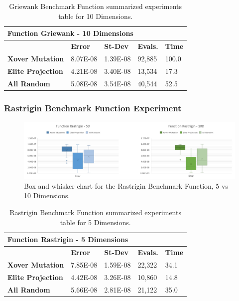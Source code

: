 \documentclass[graybox]{svmult}
\begin{document}
\begin{table}[]
    \scriptsize
    \centering
    \caption{Griewank Benchmark Function summarized experiments table for 10 Dimensions.}\label{tab.fun_griewank10}
    \begin{tabular}{@{}lllll@{}}
    \toprule
    \multicolumn{5}{l}{\textbf{Function Griewank - 10 Dimensions}} \\ \midrule
     & \textbf{Error} & \textbf{St-Dev} & \textbf{Evals.} & \textbf{Time} \\
    \textbf{Xover Mutation} & 8.07E-08 & 1.39E-08 & 92,885 & 100.0 \\
    \textbf{Elite Projection} & 4.21E-08 & 3.40E-08 & 13,534 & 17.3 \\
    \textbf{All Random} & 5.08E-08 & 3.54E-08 & 40,544 & 52.5 \\ \bottomrule
    \end{tabular}
    \end{table}


\subsubsection{Rastrigin Benchmark Function Experiment}

\begin{figure}
    \includegraphics[width=\textwidth]{img/fig_fun_rastrigin.pdf}
    \caption{Box and whisker chart for the Rastrigin Benchmark Function, 5 vs 10 Dimensions.} \label{fig.fun_rastrigin}
    \end{figure}

\begin{table}[]
    \scriptsize
    \centering
    \caption{Rastrigin Benchmark Function summarized experiments table for 5 Dimensions.}\label{tab.fun_rastrigin5}
    \begin{tabular}{@{}lllll@{}}
    \toprule
    \multicolumn{5}{l}{\textbf{Function Rastrigin - 5 Dimensions}} \\ \midrule
     & \textbf{Error} & \textbf{St-Dev} & \textbf{Evals.} & \textbf{Time} \\
    \textbf{Xover Mutation} & 7.85E-08 & 1.59E-08 & 22,322 & 34.1 \\
    \textbf{Elite Projection} & 4.42E-08 & 3.26E-08 & 10,860 & 14.8 \\
    \textbf{All Random} & 5.66E-08 & 2.81E-08 & 21,122 & 35.0 \\ \bottomrule
    \end{tabular}
    \end{table}
\end{document}
